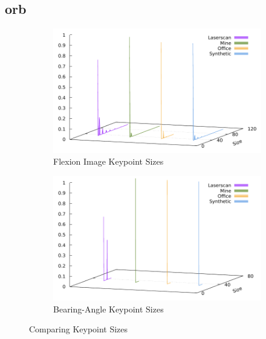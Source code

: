 \subsection{\acrshort{orb}}\label{sec:orb_stats}
\begin{figure}[H]
\begin{subfigure}[t]{0.45\linewidth}
    \includegraphics[width=\linewidth]{chapter06/results/ORB/flexion/size.pdf}%
    \caption{Flexion Image Keypoint Sizes}
\end{subfigure}\quad
\begin{subfigure}[t]{0.45\linewidth}
    \includegraphics[width=\linewidth]{chapter06/results/ORB/bearing/size.pdf}
    \caption{Bearing-Angle Keypoint Sizes}
\end{subfigure}
    \caption{Comparing Keypoint Sizes}
\end{figure}
